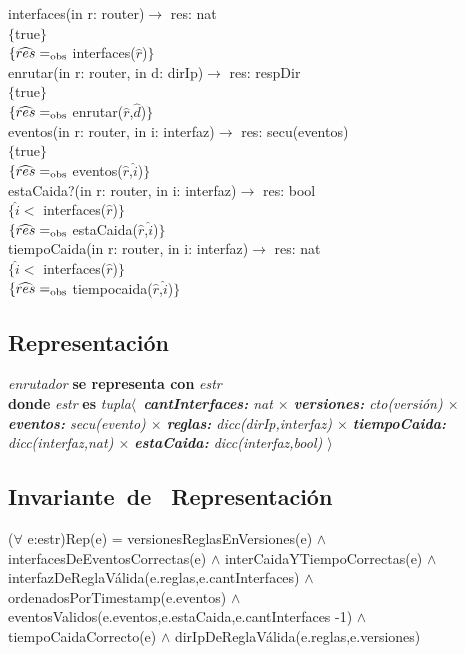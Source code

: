 interfaces(in r: router)$\longrightarrow$ res: nat\\
$\{$true$\}$\\
$\{\widehat{res} =_{\mathrm{obs}}$ interfaces($\widehat{r}$)$\}$\\

enrutar(in r: router, in d: dirIp)$\longrightarrow$ res: respDir\\
$\{$true$\}$\\
$\{\widehat{res} =_{\mathrm{obs}}$ enrutar($\widehat{r}$,$\widehat{d}$)$\}$\\

eventos(in r: router, in i: interfaz)$\longrightarrow$ res: secu(eventos)\\
$\{$true$\}$\\
$\{\widehat{res} =_{\mathrm{obs}}$ eventos($\widehat{r}$,$\widehat{i}$)$\}$\\

estaCaida?(in r: router, in i: interfaz)$\longrightarrow$ res: bool\\
$\{\widehat{i} <$ interfaces($\widehat{r}$)$\}$\\
$\{\widehat{res} =_{\mathrm{obs}}$ estaCaida($\widehat{r}$,$\widehat{i}$)$\}$\\

tiempoCaida(in r: router, in i: interfaz)$\longrightarrow$ res: nat\\
$\{\widehat{i} <$ interfaces($\widehat{r}$)$\}$\\
$\{\widehat{res} =_{\mathrm{obs}}$ tiempocaida($\widehat{r}$,$\widehat{i}$)$\}$\\


\subsection*{Representaci\'on}
\textit{enrutador} \textbf{se representa con} \textit{estr}\\
\textbf{donde} \textit{estr} \textbf{es} \textit{tupla$ \langle$\ \textbf{cantInterfaces:} nat $\times$ \textbf{versiones:} cto(versi\'on) $\times$  \textbf{eventos:} secu(evento) $\times$ \textbf{reglas:} dicc(dirIp,interfaz) $\times$ \textbf{tiempoCaida:} dicc(interfaz,nat) $\times$ \textbf{estaCaida:} dicc(interfaz,bool) $\rangle$}


\subsection*{Invariante\ de \ Representaci\'on}
\textbf{} 
($\forall$ e:estr)Rep(e) = 
versionesReglasEnVersiones(e)
$\wedge$ interfacesDeEventosCorrectas(e)
$\wedge$ interCaidaYTiempoCorrectas(e) 
$\wedge$ interfazDeReglaV\'alida(e.reglas,e.cantInterfaces)
$\wedge$ ordenadosPorTimestamp(e.eventos)
$\wedge$ eventosValidos(e.eventos,e.estaCaida,e.cantInterfaces -1)
$\wedge$ tiempoCaidaCorrecto(e)  
$\wedge$ dirIpDeReglaV\'alida(e.reglas,e.versiones)\\

